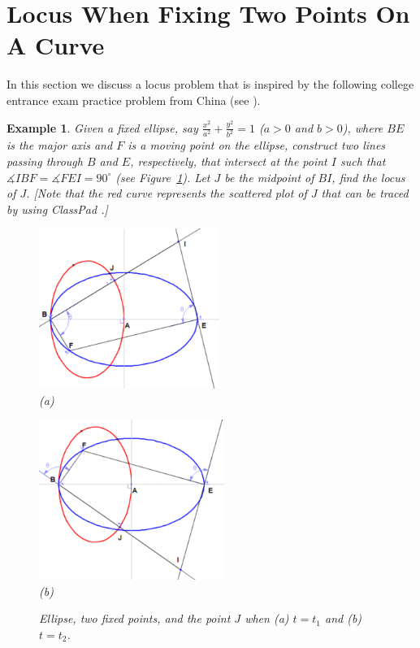 \documentclass[12pt,a4paper]{article}%
\newtheorem{example}[theorem]{Example}
\begin{document}
\section{Locus When Fixing Two Points On A Curve} \label{sec4}

In this section we discuss a locus problem that is inspired by the following
college entrance exam practice problem from China (see \cite{Gao}).

\begin{example} \label{ex8}
Given a fixed ellipse, say $\frac{x^{2}}{a^{2}}+\frac{y^{2}}{b^{2}}=1$
($a>0$ and $b>0$),
where $BE$ is the major axis and $F$ is a moving point on the ellipse,
construct two lines passing through $B$ and $E$, respectively, that
intersect at the point $I$ such that
$\measuredangle IBF=\measuredangle FEI=90^{\circ}$ (see Figure~\ref{fig10}).
Let $J$ be the midpoint of $BI$, find the locus of $J$.
[Note that the red curve represents the scattered plot of $J$
that can be traced by using ClassPad \cite{CP}.]%

\begin{figure}[htpb]
\begin{center}
\parbox[b]{2.4in}{\begin{center}
\includegraphics[natheight=3.653500in,natwidth=4.137800in,height=2.0489in,width=2.3177in]{PJH75H1I.pdf}
 \\ (a)
\end{center}}
\qquad
\parbox[b]{2.4in}{\begin{center}
\includegraphics[natheight=3.704000in,natwidth=4.294800in,height=2.0516in,width=2.3753in]{PJH75H1J.pdf}
 \\ (b)
\end{center}}
\end{center}
\caption{Ellipse, two fixed points, and the point $J$
         when (a) $t=t_1$ and (b) $t=t_2$.}
\label{fig10}
\end{figure}
\end{example}
\end{document}
